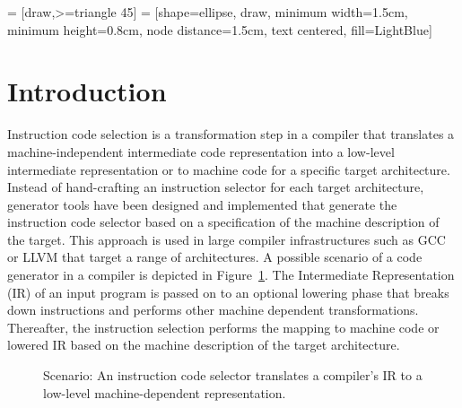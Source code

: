  = [draw,>=triangle 45]
 = [shape=ellipse, draw, minimum width=1.5cm,
                     minimum height=0.8cm, node distance=1.5cm,
                     text centered, fill=LightBlue]
\section{Introduction}

Instruction code selection is a transformation step in a compiler that
translates a machine-independent intermediate code representation into
a low-level intermediate representation or to machine code for a
specific target architecture. Instead of hand-crafting an instruction
selector for each target architecture, generator tools have been
designed and implemented that generate the instruction code selector based
on a specification of the machine description of the
target. This approach is used in large compiler infrastructures such
as GCC or LLVM that target a range of architectures.  A possible
scenario of a code generator in a compiler is depicted in
Figure~\ref{fig:instruction-selection}. The Intermediate
Representation (IR) of an input program is passed on to an optional
lowering phase that breaks down instructions and performs other
machine dependent transformations. Thereafter, the instruction
selection performs the mapping to machine code or lowered IR based on
the machine description of the target architecture.


\begin{figure}[t]
  \begin{center}
  \end{center}
  \caption{Scenario: An instruction code selector translates a compiler's IR to a
    low-level machine-dependent representation.}
  \label{fig:instruction-selection}
\end{figure}

